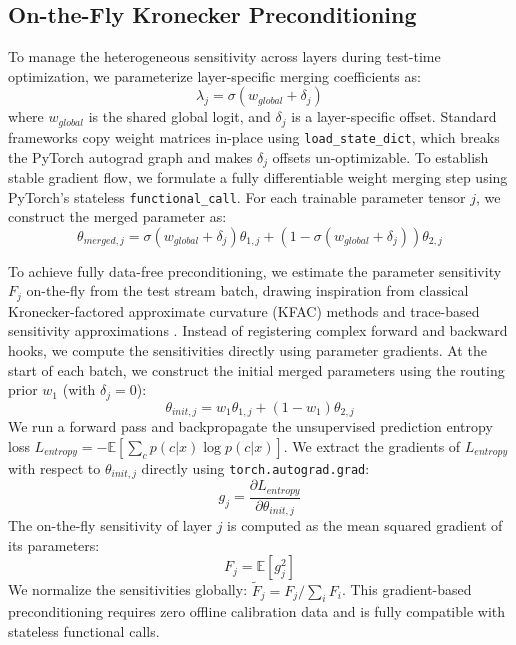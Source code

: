 \documentclass{article}
\theoremstyle{plain}
\theoremstyle{definition}
\theoremstyle{remark}
\begin{document}
\subsection{On-the-Fly Kronecker Preconditioning}
To manage the heterogeneous sensitivity across layers during test-time optimization, we parameterize layer-specific merging coefficients as:
\begin{equation}
  \lambda_j = \sigma(w_{global} + \delta_j)
\end{equation}
where $w_{global}$ is the shared global logit, and $\delta_j$ is a layer-specific offset. Standard frameworks copy weight matrices in-place using \texttt{load\_state\_dict}, which breaks the PyTorch autograd graph and makes $\delta_j$ offsets un-optimizable. To establish stable gradient flow, we formulate a fully differentiable weight merging step using PyTorch's stateless \texttt{functional\_call}. For each trainable parameter tensor $j$, we construct the merged parameter as:
\begin{equation}
  \theta_{merged, j} = \sigma(w_{global} + \delta_j) \theta_{1, j} + (1 - \sigma(w_{global} + \delta_j)) \theta_{2, j}
\end{equation}

To achieve fully data-free preconditioning, we estimate the parameter sensitivity $F_j$ on-the-fly from the test stream batch, drawing inspiration from classical Kronecker-factored approximate curvature (KFAC) methods \cite{martens2015optimizing} and trace-based sensitivity approximations \cite{eschenhagen2023kronecker}. Instead of registering complex forward and backward hooks, we compute the sensitivities directly using parameter gradients. At the start of each batch, we construct the initial merged parameters using the routing prior $w_1$ (with $\delta_j = 0$):
\begin{equation}
  \theta_{init, j} = w_1 \theta_{1, j} + (1 - w_1) \theta_{2, j}
\end{equation}
We run a forward pass and backpropagate the unsupervised prediction entropy loss $L_{entropy} = -\mathbb{E}[\sum_c p(c|x) \log p(c|x)]$. We extract the gradients of $L_{entropy}$ with respect to $\theta_{init, j}$ directly using \texttt{torch.autograd.grad}:
\begin{equation}
  g_j = \frac{\partial L_{entropy}}{\partial \theta_{init, j}}
\end{equation}
The on-the-fly sensitivity of layer $j$ is computed as the mean squared gradient of its parameters:
\begin{equation}
  F_j = \mathbb{E}[g_j^2]
\end{equation}
We normalize the sensitivities globally: $\tilde{F}_j = F_j / \sum_i F_i$. This gradient-based preconditioning requires zero offline calibration data and is fully compatible with stateless functional calls.
\end{document}
